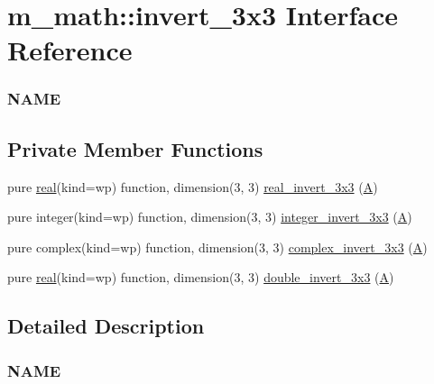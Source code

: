 \hypertarget{interfacem__math_1_1invert__3x3}{}\section{m\+\_\+math\+:\+:invert\+\_\+3x3 Interface Reference}
\label{interfacem__math_1_1invert__3x3}


\subsubsection*{N\+A\+ME} 


\subsection*{Private Member Functions}
\begin{DoxyCompactItemize}
\item 
pure \hyperlink{read__watch_83_8txt_abdb62bde002f38ef75f810d3a905a823}{real}(kind=wp) function, dimension(3, 3) \hyperlink{interfacem__math_1_1invert__3x3_a3f0b88d637ca42187292f116d935d1a4}{real\+\_\+invert\+\_\+3x3} (\hyperlink{ufpp__overview_81_8txt_a8341271e5f4e3003f6eb1c9547fc9d1a}{A})
\item 
pure integer(kind=wp) function, dimension(3, 3) \hyperlink{interfacem__math_1_1invert__3x3_aba3ace6a8e80ba9a8fe9f723d661477a}{integer\+\_\+invert\+\_\+3x3} (\hyperlink{ufpp__overview_81_8txt_a8341271e5f4e3003f6eb1c9547fc9d1a}{A})
\item 
pure complex(kind=wp) function, dimension(3, 3) \hyperlink{interfacem__math_1_1invert__3x3_a9db8803bfff866c4c74994c82585adbb}{complex\+\_\+invert\+\_\+3x3} (\hyperlink{ufpp__overview_81_8txt_a8341271e5f4e3003f6eb1c9547fc9d1a}{A})
\item 
pure \hyperlink{read__watch_83_8txt_abdb62bde002f38ef75f810d3a905a823}{real}(kind=wp) function, dimension(3, 3) \hyperlink{interfacem__math_1_1invert__3x3_a1164ade48ad211190ce02a3baf375113}{double\+\_\+invert\+\_\+3x3} (\hyperlink{ufpp__overview_81_8txt_a8341271e5f4e3003f6eb1c9547fc9d1a}{A})
\end{DoxyCompactItemize}


\subsection{Detailed Description}
\subsubsection*{N\+A\+ME}

